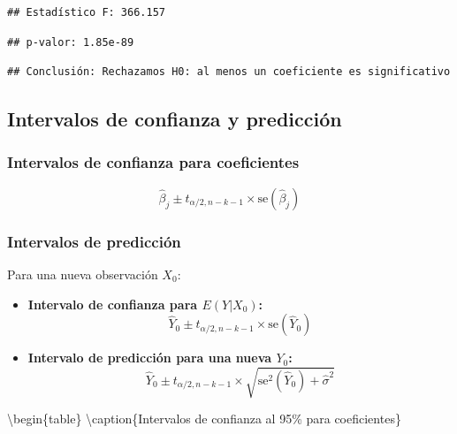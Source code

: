 \documentclass[
  oneside]{book}
\begin{document}
\begin{verbatim}
## Estadístico F: 366.157
\end{verbatim}

\begin{verbatim}
## p-valor: 1.85e-89
\end{verbatim}

\begin{verbatim}
## Conclusión: Rechazamos H0: al menos un coeficiente es significativo
\end{verbatim}

\subsection{Intervalos de confianza y predicción}\label{intervalos-de-confianza-y-predicciuxf3n}

\subsubsection{Intervalos de confianza para coeficientes}\label{intervalos-de-confianza-para-coeficientes}

\begin{equation}
\hat{\beta}_j \pm t_{\alpha/2, n-k-1} \times \text{se}(\hat{\beta}_j)
\end{equation}

\subsubsection{Intervalos de predicción}\label{intervalos-de-predicciuxf3n}

Para una nueva observación \(X_0\):

\begin{itemize}
\item
  \textbf{Intervalo de confianza para \(E(Y|X_0)\):}
  \begin{equation}
  \hat{Y}_0 \pm t_{\alpha/2, n-k-1} \times \text{se}(\hat{Y}_0)
  \end{equation}
\item
  \textbf{Intervalo de predicción para una nueva \(Y_0\):}
  \begin{equation}
  \hat{Y}_0 \pm t_{\alpha/2, n-k-1} \times \sqrt{\text{se}^2(\hat{Y}_0) + \hat{\sigma}^2}
  \end{equation}
\end{itemize}

\textbackslash begin\{table\}
\centering
\textbackslash caption\{\label{tab:intervalos}Intervalos de confianza al 95\% para coeficientes\}
\centering
\end{document}

